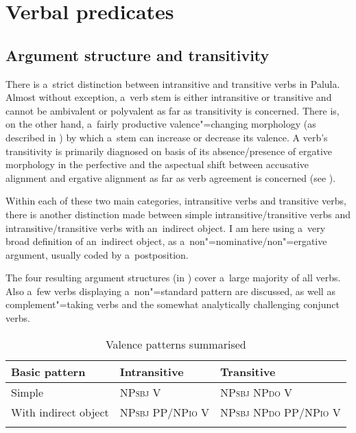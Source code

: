 \section{Verbal predicates}
\label{sec:12-2}

\subsection{Argument structure and transitivity}
\label{subsec:12-2-1}


There is a~strict distinction between intransitive and transitive verbs in Palula. Almost without exception, a~verb stem is either intransitive or transitive and cannot be ambivalent or polyvalent as far as transitivity is concerned. There is, on the other hand, a~fairly productive valence"=changing morphology (as described in ) by which a~stem can increase or decrease its valence. A verb's transitivity is primarily diagnosed on basis of its absence/presence of ergative morphology in the perfective and the aspectual shift between accusative alignment and ergative alignment as far as verb agreement is concerned (see ). 


Within each of these two main categories, intransitive verbs and transitive verbs, there is another distinction made between simple intransitive/transitive verbs and intransitive/transitive verbs with an~indirect object. I am here using a~very broad definition of an~indirect object, as a~non"=nominative/non"=ergative argument, usually coded by a~postposition. 


The four resulting argument structures (in ) cover a~large majority of all verbs. Also a~few verbs displaying a~non"=standard pattern are discussed, as well as complement"=taking verbs and the somewhat analytically challenging conjunct verbs.


\begin{table}[ht]
\caption{Valence patterns summarised}

\begin{tabularx}{\textwidth}{ Q Q Q }
\lsptoprule
Basic pattern &
Intransitive &
Transitive\\\hline
Simple &
NP\textsc{sbj} V &
NP\textsc{sbj} NP\textsc{do} V\\
With indirect object &
NP\textsc{sbj} PP/NP\textsc{io} V &
NP\textsc{sbj} NP\textsc{do} PP/NP\textsc{io} V\\\lspbottomrule
\end{tabularx}
\label{tab:12-2}
\end{table}


